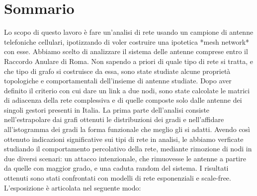 
{}
\section*{Sommario}

Lo scopo di questo lavoro è fare un'analisi di rete usando un campione di antenne telefoniche cellulari, ipotizzando di voler costruire una ipotetica *mesh network* con esse. Abbiamo scelto di analizzare il sistema delle antenne comprese entro il Raccordo Anulare di Roma. Non sapendo a priori di quale tipo di rete si tratta, e che tipo di grafo si costruisce da essa, sono state studiate alcune proprietà topologiche e comportamentali dell'insieme di antenne studiate.
Dopo aver definito il criterio con cui dare un link a due nodi, sono state calcolate le matrici di adiacenza della rete complessiva e di quelle composte solo dalle antenne dei singoli gestori presenti in Italia. La prima parte dell'analisi consiste nell'estrapolare dai grafi ottenuti le distribuzioni dei gradi e nell'affidare all'istogramma dei gradi la forma funzionale che meglio gli si adatti. Avendo così ottenuto indicazioni significative sui tipi di rete in analisi, le abbiamo verficate studiando il comportamento percolativo della rete, mediante rimozione di nodi in due diversi scenari: un attacco intenzionale, che rimuovesse le antenne a partire da quelle con maggior grado, e una caduta random del sistema. I risultati ottenuti sono stati confrontati con modelli di rete esponenziali e scale-free.
L'esposizione è articolata nel seguente modo:

